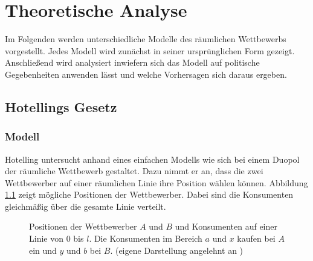 \chapter{Theoretische Analyse}\label{Kap-Theorie}

\noindent
Im Folgenden werden unterschiedliche Modelle des räumlichen Wettbewerbs vorgestellt. Jedes Modell wird zunächst in seiner ursprünglichen Form gezeigt. Anschließend wird analysiert inwiefern sich das Modell auf politische Gegebenheiten anwenden lässt und welche Vorhersagen sich daraus ergeben.

\section{Hotellings Gesetz}\label{Sec-Hotelling}

\subsection{Modell}\label{Sec-Hotelling-Modell}

Hotelling \citep{hotelling1929} untersucht anhand eines einfachen Modells wie sich bei einem Duopol der räumliche Wettbewerb gestaltet. Dazu nimmt er an, dass die zwei Wettbewerber auf einer räumlichen Linie ihre Position wählen können. Abbildung \ref{Fig-Linearer-Wettbewerb} zeigt mögliche Positionen der Wettbewerber. Dabei sind die Konsumenten gleichmäßig über die gesamte Linie verteilt.

\begin{figure}[htb]
	\centering
	\caption{Positionen der Wettbewerber $A$ und $B$ und Konsumenten auf einer Linie von $0$ bis $l$. Die Konsumenten im Bereich $a$ und $x$ kaufen bei $A$ ein und $y$ und $b$ bei $B$. (eigene Darstellung angelehnt an \citet{hotelling1929})}
	\label{Fig-Linearer-Wettbewerb}
\end{figure}


